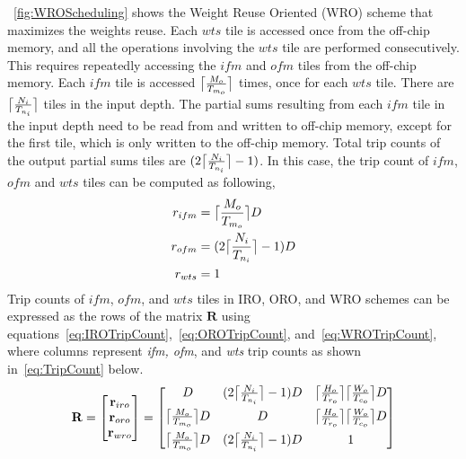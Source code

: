 \figurename~\ref{fig:WROScheduling} shows the Weight Reuse Oriented (WRO) scheme that maximizes the weights reuse. Each $wts$ tile is accessed once from the off-chip memory, and all the operations involving the $wts$ tile are performed consecutively. This requires repeatedly accessing the $ifm$ and $ofm$ tiles from the off-chip memory. Each $ifm$ tile  is accessed $\ceil[\big]{\frac{M_o}{T_{m_o}}}$ times, once for each $wts$ tile. There are $\ceil[\big]{\frac{N_i}{T_{n_i}}}$ tiles in the input depth. The partial sums resulting from each $ifm$ tile in the input depth need to be read from and written to off-chip memory, except for the first tile, which is only written to the off-chip memory. Total trip counts of the output partial sums tiles are $(2\ceil[\big]{\frac{N_i}{T_{n_i}}}-1)$. In this case, the trip count of $ifm$, $ofm$ and $wts$ tiles can be computed as following,
\begin{align}\label{eq:WROTripCount}
	\begin{split}
		r_{ifm} &= \ceil[\big]{\frac{M_o}{T_{m_o}}}D\\
		r_{ofm}&= (2\ceil[\big]{\frac{N_i}{T_{n_i}}}-1)D \\
		r_{wts} &= 1
	\end{split}
\end{align}
Trip counts of $ifm$, $ofm$, and $wts$ tiles in IRO, ORO, and WRO schemes can be expressed as the rows of the matrix $\mathbf{R}$ using equations~\ref{eq:IROTripCount},~\ref{eq:OROTripCount}, and~\ref{eq:WROTripCount}, where columns represent \textit{ifm, ofm}, and \textit{wts} trip counts as shown in~\eqref{eq:TripCount} below.
\begin{align}\label{eq:TripCount}
	\mathbf{R}=
	\begin{bmatrix}
		\mathbf{r}_{iro} \\  \mathbf{r}_{oro} \\ \mathbf{r}_{wro} \\
	\end{bmatrix}=
	\begin{bmatrix}
		D&(2\ceil[\big]{\frac{N_i}{T_{n_i}}}-1)D&\ceil[\big]{\frac{H_o}{T_{r_o}}}\ceil[\big]{\frac{W_o}{T_{c_o}}}D\\[6pt]
		\ceil[\big]{\frac{M_o}{T_{m_o}}}D&D&\ceil[\big]{\frac{H_o}{T_{r_o}}}\ceil[\big]{\frac{W_o}{T_{c_o}}} D\\[6pt]
		\ceil[\big]{\frac{M_o}{T_{m_o}}}D&(2\ceil[\big]{\frac{N_i}{T_{n_i}}}-1)D&1\\
	\end{bmatrix}
\end{align}
